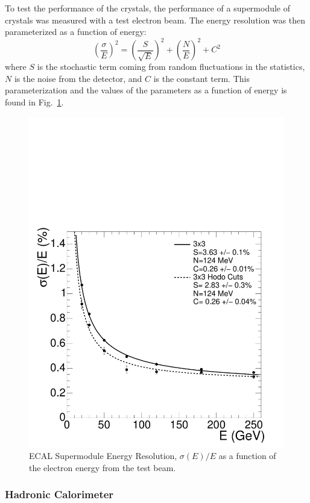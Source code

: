 To test the performance of the crystals, the performance of a supermodule of crystals was measured with a test electron beam. The energy resolution was then parameterized as a function of energy:
\begin{equation}
\left(\frac{\sigma}{E}\right)^2 = \left(\frac{S}{\sqrt{E}}\right)^2 + \left(\frac{N}{E}\right)^2 + C^2
\end{equation}
where $S$ is the stochastic term coming from random fluctuations in the statistics, $N$ is the noise from the detector, and $C$ is the constant term. This parameterization and the values of the parameters as a function of energy is found in Fig.~\ref{fig:ECALResolution}.

\begin{figure}[htbp]
\begin{center}
\includegraphics[width=.7\linewidth]{Experiment/figures/ECALResolution.pdf}
\caption[Resolution of the Electromagnetic Calorimeter as a Function of Energy]{ECAL Supermodule Energy Resolution, $\sigma(E)/E$ as a function of the electron energy from the test beam.}
\label{fig:ECALResolution}
\end{center}
\end{figure}

\subsubsection{Hadronic Calorimeter}
\label{sec:HadrCalo}

